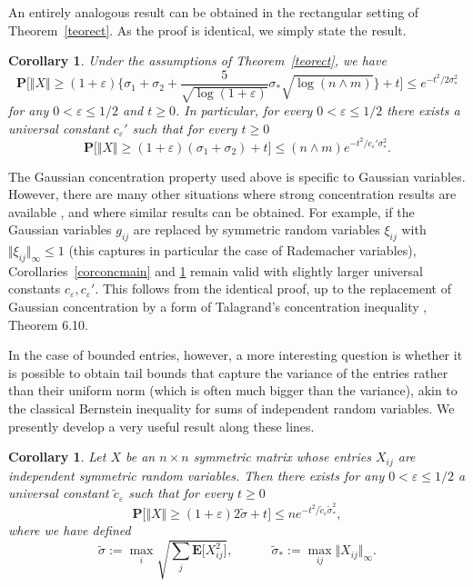 \documentclass[aop,MSNbibl,dvips]{arximspdf}
\newcommand{\rrVert}{\Vert}
\newcommand{\llVert}{\Vert}
\newtheorem{cor}[teo]{Corollary}
\newcommand{\EE}{\mathbf{E}}
\begin{document}
An entirely analogous result can be obtained in the rectangular setting of
Theorem~\ref{teorect}. As the proof is identical, we simply state the
result.

%
\begin{cor}
\label{corconcrect}
Under the assumptions of Theorem~\ref{teorect}, we have
%
\[
\mathbf{P} \biggl[ \llVert X\rrVert\ge(1+\varepsilon)\biggl\{
\sigma_1+\sigma_2 + \frac{5}{\sqrt{\log(1+\varepsilon)}} \sigma_*\sqrt{
\log(n\wedge m)}\biggr\} + t \biggr] \le e^{-t^2/2\sigma_*^2} %
\]
%
for any $0<\varepsilon\le1/2$ and $t\ge0$. In particular, for every
$0<\varepsilon\le1/2$ there exists a universal constant
$c_\varepsilon'$
such that for every $t\ge0$
%
\[
\mathbf{P}\bigl[ \llVert X\rrVert\ge(1+\varepsilon) (\sigma_1+
\sigma_2) + t \bigr] \le(n\wedge m)e^{-t^2/c_\varepsilon'\sigma_*^2}. %
\]
%
\end{cor}

The Gaussian concentration property used above is specific to Gaussian
variables. However, there are many other situations where strong
concentration results are available \cite{BLM13}, and where similar
results can be obtained. For example, if the Gaussian variables $g_{ij}$
are replaced by symmetric random variables $\xi_{ij}$ with
$\llVert \xi_{ij}\rrVert _\infty\le1$ (this captures in particular
the case of
Rademacher variables), Corollaries~\ref{corconcmain} and
\ref{corconcrect} remain valid with slightly larger universal constants
$c_\varepsilon,c_\varepsilon'$. This follows from the identical
proof, up
to the replacement of Gaussian concentration by a form of Talagrand's
concentration inequality \cite{BLM13}, Theorem 6.10.

In the case of bounded entries, however, a more interesting question is
whether it is possible to obtain tail bounds that capture the variance of
the entries rather than their uniform norm (which is often much bigger
than the variance), akin to the classical Bernstein inequality for sums of
independent random variables. We presently develop a very useful result
along these lines.

%
\begin{cor}
\label{corconcvar}
Let $X$ be an $n\times n$ symmetric matrix whose entries $X_{ij}$ are
independent symmetric random variables. Then there exists for any
$0<\varepsilon\le1/2$ a universal constant $\tilde c_\varepsilon$
such that for every $t\ge0$
%
\[
\mathbf{P}\bigl[\llVert X\rrVert\ge(1+\varepsilon)2\tilde\sigma+t\bigr
] \le
ne^{-t^2/\tilde c_\varepsilon\tilde\sigma_*^2}, %
\]
%
where we have defined
%
\[
\tilde\sigma:= \max_i \sqrt{\sum
_j \EE\bigl[X_{ij}^2\bigr]}, \qquad
\quad\tilde\sigma_* := \max_{ij}\llVert X_{ij}
\rrVert_{\infty}. %
\]
%
\end{cor}
\end{document}
